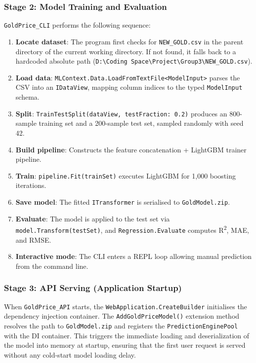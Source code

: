 \subsubsection{Stage 2: Model Training and Evaluation}
\texttt{GoldPrice\_CLI} performs the following sequence:

\begin{enumerate}
  \item \textbf{Locate dataset}: The program first checks for \texttt{NEW\_GOLD.csv} in the parent directory of the current working directory. If not found, it falls back to a hardcoded absolute path (\texttt{D:\textbackslash Coding Space\textbackslash Project\textbackslash Group3\textbackslash NEW\_GOLD.csv}).
  \item \textbf{Load data}: \texttt{MLContext.Data.LoadFromTextFile<ModelInput>} parses the CSV into an \texttt{IDataView}, mapping column indices to the typed \texttt{ModelInput} schema.
  \item \textbf{Split}: \texttt{TrainTestSplit(dataView, testFraction: 0.2)} produces an 800-sample training set and a 200-sample test set, sampled randomly with seed 42.
  \item \textbf{Build pipeline}: Constructs the feature concatenation + LightGBM trainer pipeline.
  \item \textbf{Train}: \texttt{pipeline.Fit(trainSet)} executes LightGBM for 1,000 boosting iterations.
  \item \textbf{Save model}: The fitted \texttt{ITransformer} is serialised to \texttt{GoldModel.zip}.
  \item \textbf{Evaluate}: The model is applied to the test set via \texttt{model.Transform(testSet)}, and \texttt{Regression.Evaluate} computes R\textsuperscript{2}, MAE, and RMSE.
  \item \textbf{Interactive mode}: The CLI enters a REPL loop allowing manual prediction from the command line.
\end{enumerate}

\subsubsection{Stage 3: API Serving (Application Startup)}
When \texttt{GoldPrice\_API} starts, the \texttt{WebApplication.CreateBuilder} initialises the dependency injection container. The \texttt{AddGoldPriceModel()} extension method resolves the path to \texttt{GoldModel.zip} and registers the \texttt{PredictionEnginePool} with the DI container. This triggers the immediate loading and deserialization of the model into memory at startup, ensuring that the first user request is served without any cold-start model loading delay.

